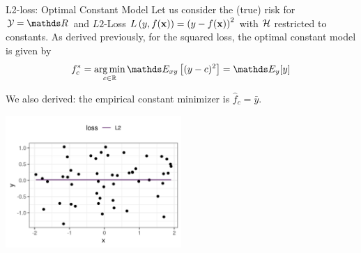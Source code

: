 \documentclass[11pt,compress,t,notes=noshow, xcolor=table]{beamer}
\begin{document}
\begin{vbframe}{L2-loss: Optimal Constant Model}
Let us consider the (true) risk for  $\Yspace = \R$ and $L2$-Loss $L\left(y, f(\mathbf{x})\right) = \left(y-f(\mathbf{x})\right)^2$ with $\mathcal{H}$ restricted to constants. %
As derived previously, for the squared loss, the optimal constant model is given by 
\vspace{-0.2cm}
$$f_{c}^{\ast} = \argmin_{c \in \mathbb{R}} \E_{xy} \left[(y-c)^2\right] =\E_{y}[y]$$



We also derived: the empirical constant minimizer is $\hat{f}_{c} = \bar y$.  
\vspace{-0.2cm}
\begin{center}
\includegraphics[width = 0.5\textwidth ]{figure/L2-loss.png} \\
\end{center}





\end{vbframe}
\end{document}
